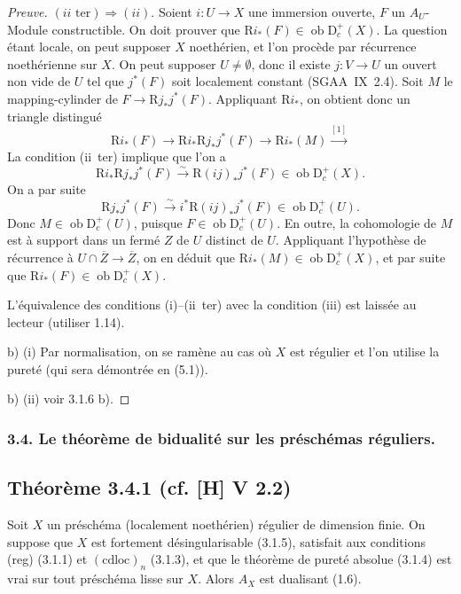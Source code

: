 \documentclass[11pt]{article}
\newcommand{\R}{\mathrm{R}}
\newcommand{\D}{\mathrm{D}}
\newcommand{\ob}{\operatorname{ob}}
\newcommand{\ol}[1]{\overline{#1}}
\providecommand{\ob}{\operatorname{ob}}
\providecommand{\R}{\mathrm R}
\begin{document}
\begin{proof}[Preuve]
$(ii\text{~ter}) \Rightarrow (ii)$. Soient $i : U \to X$ une immersion ouverte, $F$ un $A_U$-Module constructible. On doit prouver que $\R i_{*}(F) \in \ob \D_c^{+}(X)$. La question étant locale, on peut supposer $X$ noethérien, et l'on procède par récurrence noethérienne sur $X$. On peut supposer $U \neq \emptyset$, donc il existe $j : V \to U$ un ouvert non vide de $U$ tel que $j^{*}(F)$ soit localement constant (SGAA~IX~2.4). Soit $M$ le mapping-cylinder de $F \to \R j_{*}j^{*}(F)$. Appliquant $\R i_{*}$, on obtient donc un triangle distingué
\[
\R i_{*}(F) \longrightarrow \R i_{*} \R j_{*} j^{*}(F) \longrightarrow \R i_{*}(M) \xrightarrow{[1]}
\]
La condition (ii~ter) implique que l'on a
\[
\R i_{*} \R j_{*} j^{*}(F) \xrightarrow{\sim} \R(ij)_{*} j^{*}(F) \in \ob \D_c^{+}(X).
\]
On a par suite
\[
\R j_{*}j^{*}(F) \xrightarrow{\sim} i^{*} \R(ij)_{*} j^{*}(F) \in \ob \D_c^{+}(U).
\]
Donc $M \in \ob \D_c^{+}(U)$, puisque $F \in \ob \D_c^{+}(U)$. En outre, la cohomologie de $M$ est à support dans un fermé $Z$ de $U$ distinct de $U$. Appliquant l'hypothèse de récurrence à $U \cap \ol{Z} \to \ol{Z}$, on en déduit que $\R i_{*}(M) \in \ob \D_c^{+}(X)$, et par suite que $\R i_{*}(F) \in \ob \D_c^{+}(X)$.

L'équivalence des conditions (i)--(ii~ter) avec la condition (iii) est laissée au lecteur (utiliser 1.14).

b) (i) Par normalisation, on se ramène au cas où $X$ est régulier et l'on utilise la pureté (qui sera démontrée en (5.1)).

b) (ii) voir 3.1.6 b).
\end{proof}

\subsubsection{3.4. Le théorème de bidualité sur les préschémas réguliers.}

\subsection*{Théorème 3.4.1 (cf. [H] V 2.2)}
Soit $X$ un préschéma (localement noethérien) régulier de dimension finie. On suppose que $X$ est fortement désingularisable (3.1.5), satisfait aux conditions (reg) (3.1.1) et $(\mathrm{cdloc})_n$ (3.1.3), et que le théorème de pureté absolue (3.1.4) est vrai sur tout préschéma lisse sur $X$. Alors $A_X$ est dualisant (1.6).
\end{document}
